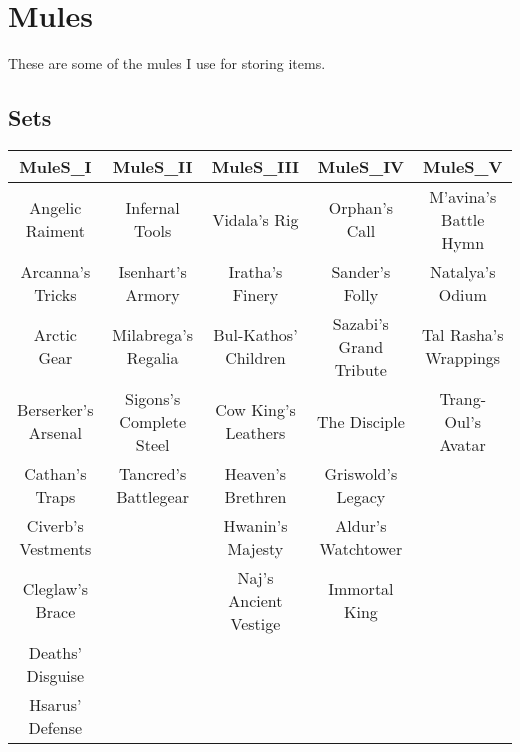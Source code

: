 \chapter{Mules}\label{label:Mules}
These are some of the mules I use for storing items. 

\section{Sets}\label{label:MulesSets}
\begin{center}
	\begin{tabular}{|c|c|c|c|c|}
	\hline
	MuleS\_I & MuleS\_II & MuleS\_III & MuleS\_IV & MuleS\_V \\
	\hline
	Angelic Raiment & Infernal Tools & Vidala's Rig & Orphan's Call & M'avina's Battle Hymn \\
	Arcanna's Tricks & Isenhart's Armory & Iratha's Finery & Sander's Folly & Natalya's Odium \\
	Arctic Gear & Milabrega's Regalia & Bul-Kathos' Children & Sazabi's Grand Tribute & Tal Rasha's Wrappings \\
	Berserker's Arsenal & Sigons's Complete Steel & Cow King's Leathers & The Disciple & Trang-Oul's Avatar \\
	Cathan's Traps & Tancred's Battlegear & Heaven's Brethren & Griswold's Legacy & \\
	Civerb's Vestments & & Hwanin's Majesty & Aldur's Watchtower & \\
	Cleglaw's Brace & & Naj's Ancient Vestige & Immortal King & \\
	Deaths' Disguise & & & & \\
	Hsarus' Defense & & & & \\
	\hline
	\end{tabular}
\end{center}